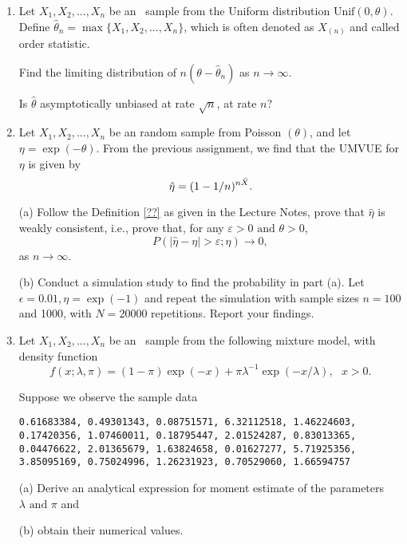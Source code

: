 \begin{enumerate}
\item 
Let $ X_{1}, X_{2}, ... , X_{n} $ be an \iid\ sample from the Uniform distribution 
$ \mathrm{Unif} (0, \theta) $. 
Define $ \hat \theta_{n} = \max \{ X_{1}, X_{2}, \ldots, X_{n} \} $, 
which is often denoted as $ X_{ (n) } $ and called order statistic.  

Find the limiting distribution of $ n ( \theta - \hat \theta_{n} ) $ as $ n \to \infty $. 

Is $\hat \theta$ asymptotically unbiased at rate $\sqrt{n}$, at rate $n$?


\item 
Let $ X_{1}, X_{2}, ... , X_{n} $ be an \iid random sample from 
Poisson $ (\theta) $, and let $ \eta = \exp ( - \theta ) $. 
From the previous assignment, we find that the UMVUE for $ \eta $ is given by 
\[ 
\hat \eta = (1 - 1/n)^{ n \bar X }. \\ 
\] 

(a) Follow the Definition \ref{??} as given in the Lecture Notes, 
prove that $ \hat \eta $ is weakly consistent, i.e., prove that,
for any $ \varepsilon > 0 \text { and } \theta > 0 $, 
\[ 
P ( | \hat \eta - \eta | > \varepsilon; \eta ) \to 0, 
\] 
as $ n \to \infty $. 

(b) Conduct a simulation study to find the probability in part (a). 
Let $\epsilon = 0.01, \eta = \exp(-1)$ and repeat
the simulation with sample sizes $n=100$ and 1000, with $N=20000$
repetitions.
Report your findings. 


\item
Let  $ X_{1}, X_{2}, ... , X_{n} $ be an \iid\ sample 
from the following mixture model, with density function 
\[ 
f(x; \lambda, \pi) 
= (1 - \pi) \exp( - x ) + \pi \lambda^{ - 1 } \exp ( - x/\lambda ), 
~~~ x > 0. 
\]  

Suppose we observe the sample data 

\begin{verbatim}
0.61683384, 0.49301343, 0.08751571, 6.32112518, 1.46224603, 
0.17420356, 1.07460011, 0.18795447, 2.01524287, 0.83013365, 
0.04476622, 2.01365679, 1.63824658, 0.01627277, 5.71925356, 
3.85095169, 0.75024996, 1.26231923, 0.70529060, 1.66594757
\end{verbatim}

(a)
Derive an analytical expression for moment estimate of  
the parameters $ \lambda \text { and } \pi $ and

(b)  obtain their numerical values.




\end{enumerate}
